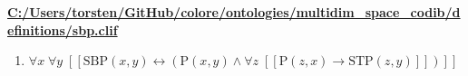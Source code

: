 \documentclass{article}
\begin{document}
\textbf{\url{C:/Users/torsten/GitHub/colore/ontologies/multidim\_space\_codib/definitions/sbp.clif}}

\begin{enumerate}
\item $\forall x\; \forall y\;  \left[ \left[ \textrm{SBP}(x,y) \leftrightarrow \left(\textrm{P}(x,y) \land \forall z\;  \left[ \left[ \textrm{P}(z,x) \rightarrow \textrm{STP}(z,y) \right] \right]\right) \right] \right]$
\end{enumerate}
\end{document}
